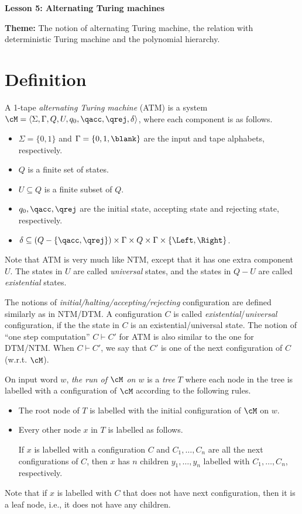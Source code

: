 \documentclass[11pt, a4paper]{article}
\renewcommand{\lesson}{5}
\renewcommand{\lessontitle}{Alternating Turing machines}
\renewcommand{\fulltitle}{Lesson \lesson: \lessontitle}
\begin{document}
\date{}



\begin{center}
{\Large {\bf \fulltitle}}
\end{center}
\vspace{0.5cm}

\noindent
{\bf Theme:} The notion of alternating Turing machine,
the relation with deterministic Turing machine and the polynomial hierarchy.



\section{Definition}
\label{sec:def-atm}

A 1-tape {\em alternating Turing machine} (ATM) is a system
$\cM =\langle \Sigma,\Gamma, Q,U,q_0,\qacc,\qrej,\delta\rangle$,
where each component is as follows.
\begin{itemize}
\item
$\Sigma =\{0,1\}$ and $\Gamma=\{0,1,\blank\}$
are the input and tape alphabets, respectively.
\item
$Q$ is a finite set of states.
\item
$U\subseteq Q$ is a finite subset of $Q$.
\item
$q_0,\qacc,\qrej$ are the initial state, accepting state and rejecting state, respectively.
\item
$\delta \subseteq (Q- \{\qacc,\qrej\})\times \Gamma \times Q\times \Gamma\times \{\Left,\Right\}$. 
\end{itemize}
Note that ATM is very much like NTM, except that it has one extra component $U$.
The states in $U$ are called {\em universal} states,
and the states in $Q- U$ are called {\em existential} states.

The notions of {\em initial/halting/accepting/rejecting} configuration are defined similarly as in NTM/DTM.
A configuration $C$ is called {\em existential}/{\em universal} configuration,
if the the state in $C$ is an existential/universal state.
The notion of ``one step computation'' $C\vdash C'$ for ATM is also similar to the one for DTM/NTM.
When $C\vdash C'$, we say that $C'$ is one of the next configuration of $C$ (w.r.t. $\cM$).

On input word $w$, {\em the run of $\cM$ on $w$} is a {\em tree} $T$ where each node in the tree is labelled with a configuration of $\cM$
according to the following rules.
\begin{itemize}
\item
The root node of $T$ is labelled with the initial configuration of $\cM$ on $w$.
\item
Every other node $x$ in $T$ is labelled as follows.

If $x$ is labelled with a configuration $C$
and $C_1,\ldots,C_n$ are all the next configurations of $C$,
then $x$ has $n$ children $y_1,\ldots,y_n$ labelled with $C_1,\ldots,C_n$, respectively.
\end{itemize}
Note that if $x$ is labelled with $C$ that does not have next configuration, 
then it is a leaf node, i.e., it does not have any children.
\end{document}
